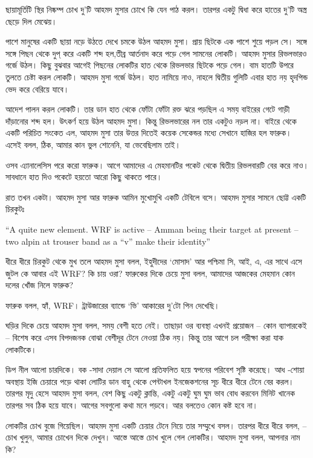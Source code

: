 \documentclass[
]{book}
\begin{document}
ছায়ামূর্তিটি স্থির নিষ্কম্প চোখ দু'টি আহমদ মুসার চোখে কি যেন পাঠ করল। তারপর একটু দ্বিধা করে হাতের দু'টি অস্ত্র ছেড়ে দিল মেঝেয়।

পাশে মানুষের একটি ছায়া নড়ে উঠতে দেখে চমকে উঠল আহমদ মুসা। প্রায় ছিটকে এক পাশে শুয়ে পড়ল সে। সঙ্গে সঙ্গে পিছন থেকে দুপ্ করে একটি শব্দ হল,তীব্র আর্তনাদ করে পড়ে গেল সামনের লোকটি। আহমদ মুসার রিভলভারও গর্জে উঠল। কিছু বুঝবার আগেই পিছনের লোকটির হাত থেকে রিভলভার ছিটকে পড়ে গেল। বাম হাতটি উপরে তুলতে চেষ্টা করল লোকটি। আহমদ মুসা গর্জে উঠল। হাত নামিয়ে নাও, নাহলে দ্বিতীয় গুলিটি এবার হাত নয় হৃদপিন্ড ভেদ করে বেরিয়ে যাবে।

আদেশ পালন করল লোকটি। তার ডান হাত থেকে ফোঁটা ফোঁটা রক্ত ঝরে পড়ছিল এ সময় বাইরের গেটে গাড়ী দাঁড়ানোর শব্দ হল। উৎকর্ণ হয়ে উঠল আহমদ মুসা। কিন্তু রিভলভারের নল তার একটুও নড়ল না। বাইরে থেকে একটি পরিচিত সংকেত এল, আহমদ মুসা তার উত্তর দিতেই কয়েক সেকেন্ডর মধ্যে সেখানে হাজির হল ফারুক। এসেই বলল, ঠিক, আমার কান ভুল শোনেনি, যা ভেবেছিলাম তাই।

ওসব এ্যানালেসিস পরে করো ফারুক। আগে আমাদের এ মেহমানটির পকেট থেকে দ্বিতীয় রিভলবারটি বের করে নাও। সাবধানে হাত দিও পকেটে হয়তো আরো কিছু থাকতে পারে।

রাত তখন একটা। আহমদ মুসা আর ফারুক আমিন মুখোমুখি একটি টেবিলে বসে। আহমদ মুসার সামনে ছোট্ট একটি চিরকুটঃ

``A quite new element. WRF is active -- Amman being their target at present -- two alpin at trouser band as a ``v'' make their identity''

ধীরে ধীরে চিরকুট থেকে মুখ তলে আহমদ মুসা বলল, ইহুদীদের `মোসাদ' আর পশ্চিমা সি, আই, এ, এর সাথে এসে জুটল কে আবার এই WRF? কি চায় ওরা? ফারুকের দিকে চেয়ে মুসা বলল, আমাদের আজকের মেহমান কোন দলের খোঁজ নিলে ফারুক?

ফারুক বলল, হ্যাঁ, WRF। ট্রাউজারের ব্যান্ডে `ভি' আকারের দু'টো পিন দেখেছি।

ঘড়ির দিকে চেয়ে আহমদ মুসা বলল, সময় বেশী হতে নেই। তাছাড়া ওর ব্যবস্থা এখনই প্রয়োজন -- কোন ব্যাপারকেই -- বিশেষ করে এসব বিপদজনক বোঝা বেশীদূর টেনে নেওয়া ঠিক নয়। কিন্তু তার আগে চল পরীক্ষা করা যাক লোকটিকে।

ডিপ নীল আলো চারদিকে। বক -সাদা দেয়াল সে আলো প্রতিফলিত হয়ে স্বপনের পরিবেশ সৃষ্টি করেছে। আধ -শোয়া অবস্থায় ইজি চেয়ারে পড়ে থাকা লোটির ডান বাহু থেকে পেন্টাখল ইনজেকশনের সূচ ধীরে ধীরে টেনে বের করল। তারপর মৃদু হেসে আহমদ মুসা বলল, বেশ কিছু একটু ক্লান্তি, একটু একটু ঘুম ঘুম ভাব বোধ করবেন মিনিট খানেক তারপর সব ঠিক হয়ে যাবে। আগের সবগুলো কথা মনে পড়বে। আর বলতেও কোন কষ্ট হবে না।

লোকটির চোখ বুজে গিয়েছিল। আহমদ মুসা একটি চেয়ার টেনে নিয়ে তার সম্মুখে বসল। তারপর ধীরে ধীরে বলল, -- চোখ খুলুন, আমার চোখেন দিকে দেখুন। আস্তে আস্তে চোখ খুলে গেল লোকটির। আহমদ মুসা বলল, আপনার নাম কি?
\end{document}
